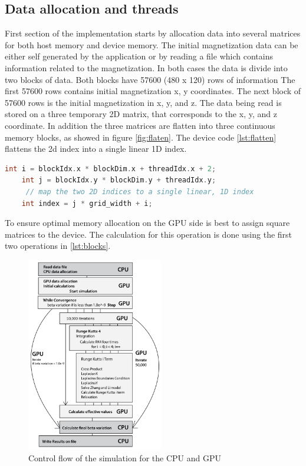 \subsection{Data allocation and threads}

First section of the implementation starts by allocation data into several matrices for both host memory and device memory. The initial magnetization data can be either self generated by the application or by reading a file which contains information related to the magnetization. In both cases the data is divide into two blocks of data. Both blocks have 57600 (480 x 120) rows of information The first 57600 rows contains initial magnetization x, y coordinates. The next block of 57600 rows is the initial magnetization in x, y, and z. The data being read is stored on a three temporary 2D matrix, that corresponds to the x, y, and z coordinate. In addition the three matrices are flatten into three continuous memory blocks, as showed in figure \ref{fig:flaten}. The device code \ref{lst:flatten} flattens the 2d index into a single linear 1D index.

\begin{lstlisting}[language=C++, label={lst:flatten}, caption={Kernel Flatten from a 2 value index to a single value index.}]	
    int i = blockIdx.x * blockDim.x + threadIdx.x + 2;
    int j = blockIdx.y * blockDim.y + threadIdx.y;
     // map the two 2D indices to a single linear, 1D index
    int index = j * grid_width + i; 
\end{lstlisting}


To ensure optimal memory allocation on the GPU side is best to assign square matrices to the device. The calculation for this operation is done using the first two operations in \ref{lst:blocks}.

\begin{figure}[htbp]
	\centering
		\includegraphics[width=0.53\textwidth]{Figures/flow.png}
		\smallskip
	\caption[Control flow]{Control flow of the simulation for the CPU and GPU}
	\label{fig:flow}
\end{figure}


